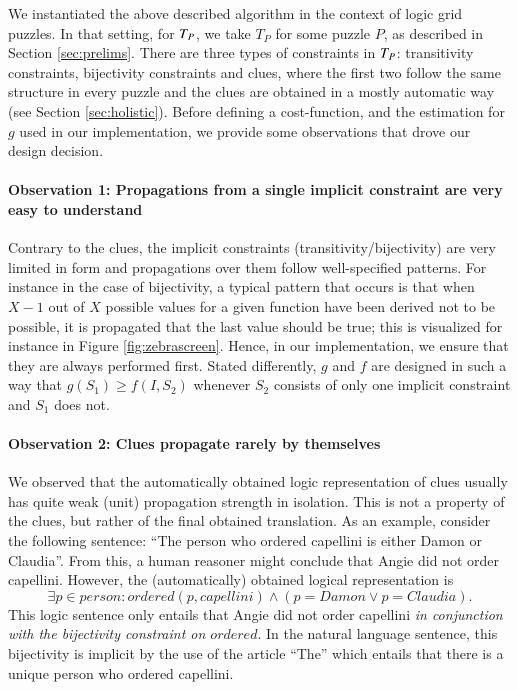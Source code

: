 We instantiated the above described algorithm in the context of logic grid puzzles. 
In that setting, for $T_P$, we take $T_P$ for some puzzle $P$, as described in Section \ref{sec:prelims}. 
There are three types of constraints in $T_P$: transitivity constraints, bijectivity constraints and clues, where the first two follow the same structure in every puzzle and the clues are obtained in a mostly automatic way (see Section \ref{sec:holistic}). 
Before defining a cost-function, and the estimation for $g$ used in our implementation, we provide some observations that drove our design decision. 

\paragraph{Observation 1: Propagations from a single implicit constraint are very easy to understand} Contrary to the clues, the implicit constraints (transitivity/bijectivity) are very limited in form and propagations over them follow well-specified patterns. 
For instance in the case of bijectivity, a typical pattern that occurs is that when $X-1$ out of $X$ possible values for a given function have been derived not to be possible, it is propagated that the last value should be true; this is visualized for instance in Figure \ref{fig:zebrascreen}. 
Hence, in our implementation, we ensure that they are always performed first. Stated differently, $g$ and $f$ are designed in such a way that $g(S_1)\geq f(I,S_2)$  whenever $S_2$ consists of only one implicit constraint and $S_1$ does not. 

\paragraph{Observation 2: Clues propagate rarely by themselves}
We observed that the automatically obtained logic representation of clues usually has quite weak (unit) propagation strength in isolation. 
This is not a property of the clues, but rather of the final obtained translation. As an example, consider the following sentence: 
``The person who ordered capellini is either Damon or Claudia''. From this, a human reasoner might conclude that Angie did not order capellini. 
However, the (automatically) obtained logical representation is 
\[\exists p\in \mathit{person}: \mathit{ordered}(p, \mathit{capellini})\land (p =  \mathit{Damon}\lor p =  \mathit{Claudia}).\]
This logic sentence only entails that Angie did not order capellini \emph{in conjunction with the bijectivity constraint on $ \mathit{ordered}$}.
In the natural language sentence, this bijectivity is implicit by the use of the article ``The'' which entails that there is a unique person who ordered capellini. 

